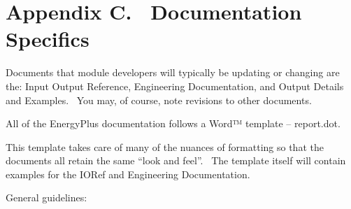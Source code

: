 \chapter{Appendix C.~ Documentation Specifics}\label{appendix-c.-documentation-specifics}

Documents that module developers will typically be updating or changing are the: Input Output Reference, Engineering Documentation, and Output Details and Examples.~ You may, of course, note revisions to other documents.

All of the EnergyPlus documentation follows a Word™ template -- report.dot.

This template takes care of many of the nuances of formatting so that the documents all retain the same ``look and feel''.~ The template itself will contain examples for the IORef and Engineering Documentation.

General guidelines:

